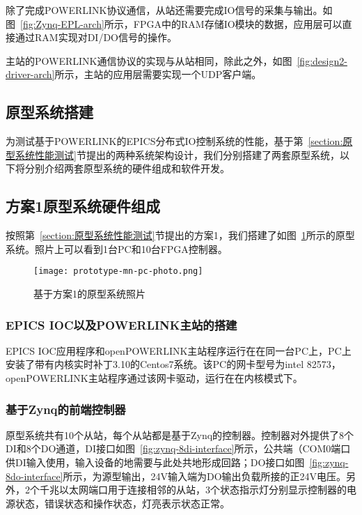 除了完成POWERLINK协议通信，从站还需要完成IO信号的采集与输出。如图~\ref{fig:Zynq-EPL-arch}所示，FPGA中的RAM存储IO模块的数据，应用层可以直接通过RAM实现对DI/DO信号的操作。

主站的POWERLINK通信协议的实现与从站相同，除此之外，如图~\ref{fig:design2-driver-arch}所示，主站的应用层需要实现一个UDP客户端。

\subsection{原型系统搭建}

为测试基于POWERLINK的EPICS分布式IO控制系统的性能，基于第~\ref{section:原型系统性能测试}节提出的两种系统架构设计，我们分别搭建了两套原型系统，以下将分别介绍两套原型系统的硬件组成和软件开发。

\subsection{方案1原型系统硬件组成} 

按照第~\ref{section:原型系统性能测试}节提出的方案1，我们搭建了如图~\ref{fig:prototype-mn-pc-photo}所示的原型系统。照片上可以看到1台PC和10台FPGA控制器。

\begin{figure}[!htb]
  \centering
  \texttt{[image: prototype-mn-pc-photo.png]}
  \caption{基于方案1的原型系统照片}
  \label{fig:prototype-mn-pc-photo}
\end{figure}

\subsubsection{EPICS IOC以及POWERLINK主站的搭建}

EPICS IOC应用程序和openPOWERLINK主站程序运行在在同一台PC上，PC上安装了带有内核实时补丁3.10的Centos7系统。该PC的网卡型号为intel 82573，openPOWERLINK主站程序通过该网卡驱动，运行在在内核模式下。

\subsubsection{基于Zynq的前端控制器}

原型系统共有10个从站，每个从站都是基于Zynq的控制器。控制器对外提供了8个DI和8个DO通道，DI接口如图~\ref{fig:zynq-8di-interface}所示，公共端（COM0端口供DI输入使用，输入设备的地需要与此处共地形成回路；DO接口如图~\ref{fig:zynq-8do-interface}所示，为源型输出，24V输入端为DO输出负载所接的正24V电压。另外，2个千兆以太网端口用于连接相邻的从站，3个状态指示灯分别显示控制器的电源状态，错误状态和操作状态，灯亮表示状态正常。

